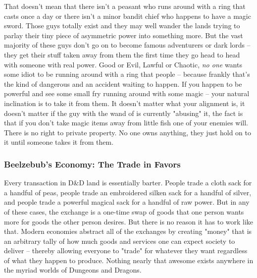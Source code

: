 That doesn't mean that there isn't a peasant who runs around with a ring that casts  once a day or there isn't a minor bandit chief who happens to have a magic sword. Those guys totally exist and they may well wander the lands trying to parlay their tiny piece of asymmetric power into something more. But the vast majority of these guys don't go on to become famous adventurers or dark lords -- they get their stuff taken away from them the first time they go head to head with someone with real power. Good or Evil, Lawful or Chaotic, \textit{no one} wants some idiot to be running around with a ring that  people -- because frankly that's the kind of dangerous and an accident waiting to happen. If you happen to be powerful and see some small fry running around with some magic -- your natural inclination is to take it from them. It doesn't matter what your alignment is, it doesn't matter if the guy with the wand of  is currently "abusing" it, the fact is that if you don't take magic items away from little fish one of your enemies will. There is no right to private property. No one owns anything, they just hold on to it until someone takes it from them.

\subsubsection{Beelzebub's Economy: The Trade in Favors}
\vspace*{-8pt}

Every transaction in D\&D land is essentially barter. People trade a cloth sack for a handful of peas, people trade an embroidered silken sack for a handful of silver, and people trade a powerful magical sack for a handful of raw power. But in any of these cases, the exchange is a one-time swap of goods that one person wants more for goods the other person desires. But there is no reason it has to work like that. Modern economies abstract all of the exchanges by creating "money" that is an arbitrary tally of how much goods and services one can expect society to deliver -- thereby allowing everyone to "trade" for whatever they want regardless of what they happen to produce. Nothing nearly that awesome exists anywhere in the myriad worlds of Dungeons and Dragons.


